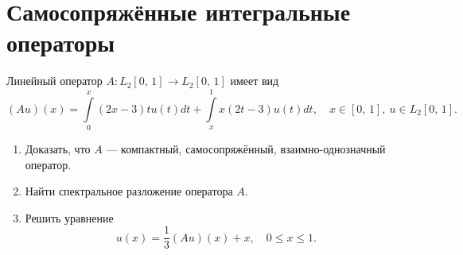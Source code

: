 \documentclass[a4paper]{article}
\begin{document}
\section{Самосопряжённые интегральные операторы}
\begin{hiProb}[№5]
	Линейный оператор $A:L_2[0,\,1]\to L_2[0,\,1]$ имеет
	вид
	\[
		(Au)(x)= \int\limits_{0}^{x} (2x-3) tu(t)dt+
		\int\limits_{x}^{1} x(2t-3)u(t)dt,\quad
		x \in [0,\,1],\ u \in L_2[0,\,1]
	.\]
	\begin{enumerate}
	\item Доказать, что $A$ --- компактный, самосопряжённый,
		взаимно-однозначный оператор.
	\item Найти спектральное разложение оператора $A$.
	\item Решить уравнение
		\[
			u(x)=\frac{1}{3}(Au)(x)+x,\quad
			0\le x\le 1
		.\] 
	\end{enumerate}
\end{hiProb}
\end{document}
